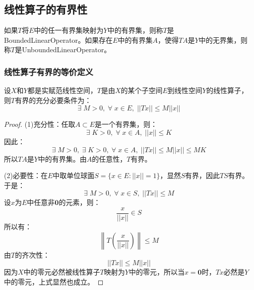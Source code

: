 \subsection{线性算子的有界性}
\begin{definition}
	如果$T$将$E$中的任一有界集映射为$Y$中的有界集，则称$T$是\gls{BoundedLinearOperator}。如果存在$E$中的有界集$A$，使得$TA$是$Y$中的无界集，则称$T$是\gls{UnboundedLinearOperator}。
\end{definition}
\subsubsection{线性算子有界的等价定义}
\begin{theorem}
	设$X$和$Y$都是实赋范线性空间，$T$是由$X$的某个子空间$E$到线性空间$Y$的线性算子，则$T$有界的充分必要条件为：
	\begin{equation*}
		\exists\;M>0,\;\forall\;x\in E,\;||Tx||\leqslant M||x||
	\end{equation*}
\end{theorem}
\begin{proof}
	(1)充分性：任取$A\subset E$是一个有界集，则：
	\begin{equation*}
		\exists\;K>0,\;\forall\;x\in A,\;||x||\leqslant K
	\end{equation*}
	因此：
	\begin{equation*}
		\exists\;M>0,\;\exists\;K>0,\;\forall\;x\in A,\;||Tx||\leqslant M||x||\leqslant MK
	\end{equation*}
	所以$TA$是$Y$中的有界集。由$A$的任意性，$T$有界。\par
	(2)必要性：在$E$中取单位球面$S=\{x\in E:||x||=1\}$，显然$S$有界，因此$TS$有界。于是：
	\begin{equation*}
		\exists\;M>0,\;\forall\;x\in S,\;||Tx||\leqslant M
	\end{equation*}
	设$x$为$E$中任意非$\mathbf{0}$的元素，则：
	\begin{equation*}
		\frac{x}{||x||}\in S
	\end{equation*}
	所以有：
	\begin{equation*}
		\left\|T\left(\frac{x}{||x||}\right)\right\|\leqslant M
	\end{equation*}
	由$T$的齐次性：
	\begin{equation*}
		||Tx||\leqslant M||x||
	\end{equation*}
	因为$X$中的零元必然被线性算子$T$映射为$Y$中的零元，所以当$x=\mathbf{0}$时，$Tx$必然是$Y$中的零元，上式显然也成立。
\end{proof}

